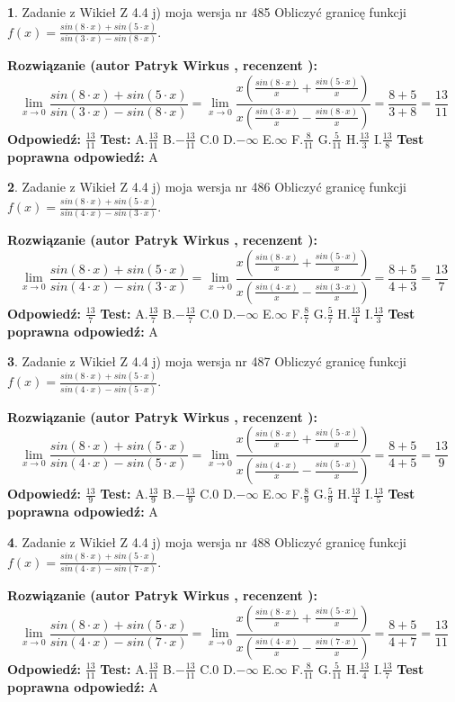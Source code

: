 \documentclass[12pt, a4paper]{article}
\theoremstyle{definition} %
\newtheorem{zad}{}
\newcommand{\zadStart}[1]{\begin{zad}#1\newline}
\newcommand{\zadStop}{\end{zad}}
\newcommand{\rozwStart}[2]{\noindent \textbf{Rozwiązanie (autor #1 , recenzent #2): }\newline}
\newcommand{\rozwStop}{\newline}
\newcommand{\odpStart}{\noindent \textbf{Odpowiedź:}\newline}
\newcommand{\odpStop}{\newline}
\newcommand{\testStart}{\noindent \textbf{Test:}\newline}
\newcommand{\testStop}{\newline}
\newcommand{\kluczStart}{\noindent \textbf{Test poprawna odpowiedź:}\newline}
\newcommand{\kluczStop}{\newline}
\begin{document}
\zadStart{Zadanie z Wikieł Z 4.4 j) moja wersja nr 485}
Obliczyć granicę funkcji $f(x)=\frac{sin(8\cdot x) +sin(5\cdot x)}{sin(3\cdot x) -sin(8\cdot x)}$.
\zadStop
\rozwStart{Patryk Wirkus}{}
$$\lim\limits_{x\to 0}\frac{sin(8\cdot x) +sin(5\cdot x)}{sin(3\cdot x) -sin(8\cdot x)}=\lim\limits_{x\to 0}\frac{x(\frac{sin(8\cdot x)}{x}+\frac{sin(5\cdot x)}{x})}{x(\frac{sin(3\cdot x)}{x}-\frac{sin(8\cdot x)}{x})}=\frac{8+5}{3+8} = \frac{13}{11}$$
\rozwStop
\odpStart
$\frac{13}{11}$
\odpStop
\testStart
A.$\frac{13}{11}$
B.$-\frac{13}{11}$
C.$0$
D.$-\infty$
E.$\infty$
F.$\frac{8}{11}$
G.$\frac{5}{11}$
H.$\frac{13}{3}$
I.$\frac{13}{8}$
\testStop
\kluczStart
A
\kluczStop



\zadStart{Zadanie z Wikieł Z 4.4 j) moja wersja nr 486}
Obliczyć granicę funkcji $f(x)=\frac{sin(8\cdot x) +sin(5\cdot x)}{sin(4\cdot x) -sin(3\cdot x)}$.
\zadStop
\rozwStart{Patryk Wirkus}{}
$$\lim\limits_{x\to 0}\frac{sin(8\cdot x) +sin(5\cdot x)}{sin(4\cdot x) -sin(3\cdot x)}=\lim\limits_{x\to 0}\frac{x(\frac{sin(8\cdot x)}{x}+\frac{sin(5\cdot x)}{x})}{x(\frac{sin(4\cdot x)}{x}-\frac{sin(3\cdot x)}{x})}=\frac{8+5}{4+3} = \frac{13}{7}$$
\rozwStop
\odpStart
$\frac{13}{7}$
\odpStop
\testStart
A.$\frac{13}{7}$
B.$-\frac{13}{7}$
C.$0$
D.$-\infty$
E.$\infty$
F.$\frac{8}{7}$
G.$\frac{5}{7}$
H.$\frac{13}{4}$
I.$\frac{13}{3}$
\testStop
\kluczStart
A
\kluczStop



\zadStart{Zadanie z Wikieł Z 4.4 j) moja wersja nr 487}
Obliczyć granicę funkcji $f(x)=\frac{sin(8\cdot x) +sin(5\cdot x)}{sin(4\cdot x) -sin(5\cdot x)}$.
\zadStop
\rozwStart{Patryk Wirkus}{}
$$\lim\limits_{x\to 0}\frac{sin(8\cdot x) +sin(5\cdot x)}{sin(4\cdot x) -sin(5\cdot x)}=\lim\limits_{x\to 0}\frac{x(\frac{sin(8\cdot x)}{x}+\frac{sin(5\cdot x)}{x})}{x(\frac{sin(4\cdot x)}{x}-\frac{sin(5\cdot x)}{x})}=\frac{8+5}{4+5} = \frac{13}{9}$$
\rozwStop
\odpStart
$\frac{13}{9}$
\odpStop
\testStart
A.$\frac{13}{9}$
B.$-\frac{13}{9}$
C.$0$
D.$-\infty$
E.$\infty$
F.$\frac{8}{9}$
G.$\frac{5}{9}$
H.$\frac{13}{4}$
I.$\frac{13}{5}$
\testStop
\kluczStart
A
\kluczStop



\zadStart{Zadanie z Wikieł Z 4.4 j) moja wersja nr 488}
Obliczyć granicę funkcji $f(x)=\frac{sin(8\cdot x) +sin(5\cdot x)}{sin(4\cdot x) -sin(7\cdot x)}$.
\zadStop
\rozwStart{Patryk Wirkus}{}
$$\lim\limits_{x\to 0}\frac{sin(8\cdot x) +sin(5\cdot x)}{sin(4\cdot x) -sin(7\cdot x)}=\lim\limits_{x\to 0}\frac{x(\frac{sin(8\cdot x)}{x}+\frac{sin(5\cdot x)}{x})}{x(\frac{sin(4\cdot x)}{x}-\frac{sin(7\cdot x)}{x})}=\frac{8+5}{4+7} = \frac{13}{11}$$
\rozwStop
\odpStart
$\frac{13}{11}$
\odpStop
\testStart
A.$\frac{13}{11}$
B.$-\frac{13}{11}$
C.$0$
D.$-\infty$
E.$\infty$
F.$\frac{8}{11}$
G.$\frac{5}{11}$
H.$\frac{13}{4}$
I.$\frac{13}{7}$
\testStop
\kluczStart
A
\kluczStop
\end{document}
